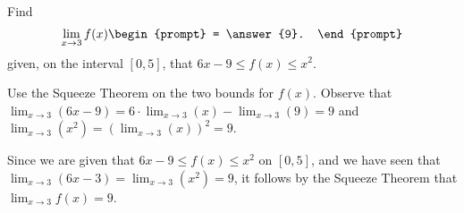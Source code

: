 \documentclass{ximera}
\author{Gregory Hartman \and Matthew Carr}
\begin{document}
\begin{exercise}




Find 
\[
\lim_{x\to3}f(x)
\begin{prompt}
= \answer{9}.
\end{prompt}
\]
given, on the interval $\left[0,5\right]$, that $6x-9\le f(x)\le x^2$.
\begin{hint}
Use the Squeeze Theorem on the two bounds for $f(x)$. Observe that $\lim_{x\to3}\left({6x-9}\right)=6\cdot\lim_{x\to3}(x)-\lim_{x\to3}\left({9}\right)=9$ and $\lim_{x\to3}\left({x^2}\right)=\left({\lim_{x\to3}(x)}\right)^2=9$.
\end{hint}
\begin{hint}
Since we are given that $6x-9\le f(x)\le x^2$ on $\left[0,5\right]$, and we have seen that $\lim_{x\to3}\left({6x-3}\right)=\lim_{x\to3}\left({x^2}\right)=9$, it follows by the Squeeze Theorem that $\lim_{x\to3}f(x)=9$.
\end{hint}
\end{exercise}
\end{document}
